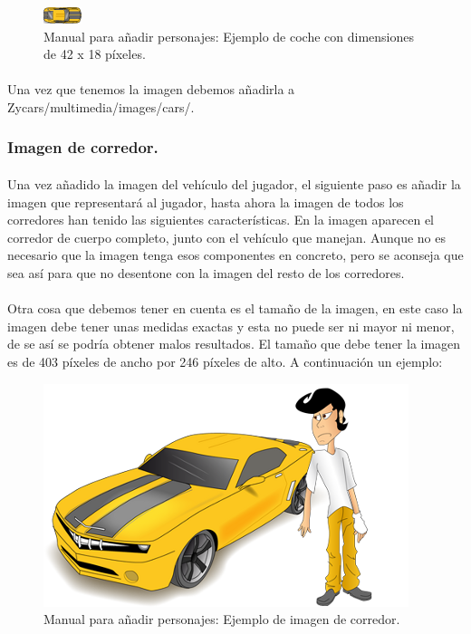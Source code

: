 \begin{figure}[H]
  \label{ejemplo_coche}
  \begin{center}
    \includegraphics[scale=1]{imagenes/ejemplo_coche.png}
  \end{center}
  \caption{Manual para añadir personajes: Ejemplo de coche con dimensiones de 42 x 18 píxeles.}
\end{figure}

\paragraph{}
Una vez que tenemos la imagen debemos añadirla a Zycars/multimedia/images/cars/.

\subsubsection{Imagen de corredor.}

\paragraph{}
Una vez añadido la imagen del vehículo del jugador, el siguiente paso es añadir la imagen que representará al jugador, hasta ahora 
la imagen de todos los corredores han tenido las siguientes características. En la imagen aparecen el corredor de cuerpo completo, 
junto con el vehículo que manejan. Aunque no es necesario que la imagen tenga esos componentes en concreto, pero se aconseja que sea
así para que no desentone con la imagen del resto de los corredores.

\paragraph{}
Otra cosa que debemos tener en cuenta es el tamaño de la imagen, en este caso la imagen debe tener unas medidas exactas y esta no
puede ser ni mayor ni menor, de se así se podría obtener malos resultados. El tamaño que debe tener la imagen es de 403 píxeles de
ancho por 246 píxeles de alto. A continuación un ejemplo:

\begin{figure}[H]
  \label{ejemplo_personaje}
  \begin{center}
    \includegraphics[scale=0.5]{imagenes/ejemplo_personaje.png}
  \end{center}
  \caption{Manual para añadir personajes: Ejemplo de imagen de corredor.}
\end{figure}

